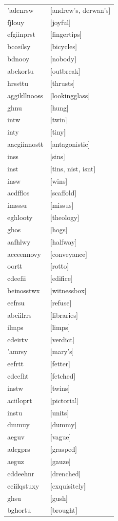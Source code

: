 \documentclass{article}
\begin{document}
\begin{tabular}{ll}
'adenrsw & [andrew's, derwan's] \\
fjlouy & [joyful] \\
efgiinprst & [fingertips] \\
bcceilsy & [bicycles] \\
bdnooy & [nobody] \\
abekortu & [outbreak] \\
hrssttu & [thrusts] \\
aggikllnooss & [lookingglass] \\
ghnu & [hung] \\
intw & [twin] \\
inty & [tiny] \\
aacgiinnostt & [antagonistic] \\
inss & [sins] \\
inst & [tins, nist, isnt] \\
insw & [wins] \\
acdfflos & [scaffold] \\
imsssu & [missus] \\
eghlooty & [theology] \\
ghos & [hogs] \\
aafhlwy & [halfway] \\
acceennovy & [conveyance] \\
oortt & [rotto] \\
cdeefii & [edifice] \\
beinosstwx & [witnessbox] \\
eefrsu & [refuse] \\
abeiilrrs & [libraries] \\
ilmps & [limps] \\
cdeirtv & [verdict] \\
'amrsy & [mary's] \\
eefrtt & [fetter] \\
cdeefht & [fetched] \\
instw & [twins] \\
aciiloprt & [pictorial] \\
instu & [units] \\
dmmuy & [dummy] \\
aeguv & [vague] \\
adegprs & [grasped] \\
aeguz & [gauze] \\
cddeehnr & [drenched] \\
eeiilqstuxy & [exquisitely] \\
ghsu & [gush] \\
bghortu & [brought] \\

\end{tabular}
\end{document}
